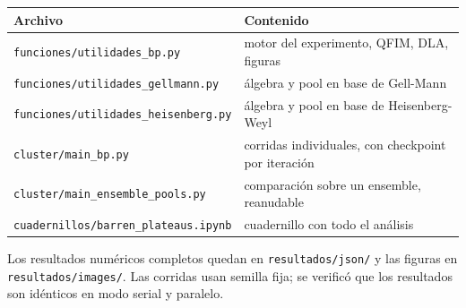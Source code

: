 \documentclass[11pt,a4paper]{article}
\begin{document}
\begin{center}
\begin{tabular}{ll}
\toprule
Archivo & Contenido \\
\midrule
\texttt{funciones/utilidades\_bp.py} & motor del experimento, QFIM, DLA, figuras \\
\texttt{funciones/utilidades\_gellmann.py} & álgebra y pool en base de Gell-Mann \\
\texttt{funciones/utilidades\_heisenberg.py} & álgebra y pool en base de Heisenberg-Weyl \\
\texttt{cluster/main\_bp.py} & corridas individuales, con checkpoint por iteración \\
\texttt{cluster/main\_ensemble\_pools.py} & comparación sobre un ensemble, reanudable \\
\texttt{cuadernillos/barren\_plateaus.ipynb} & cuadernillo con todo el análisis \\
\bottomrule
\end{tabular}
\end{center}

\noindent
Los resultados numéricos completos quedan en \texttt{resultados/json/} y las
figuras en \texttt{resultados/images/}. Las corridas usan semilla fija; se
verificó que los resultados son idénticos en modo serial y paralelo.
\end{document}
